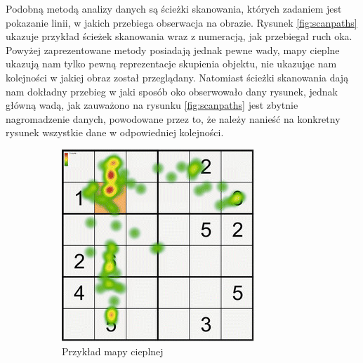 Podobną metodą analizy danych są ścieżki skanowania, których zadaniem jest pokazanie linii, w jakich przebiega obserwacja na obrazie. Rysunek \ref{fig:scanpaths} ukazuje przykład ścieżek skanowania wraz z numeracją, jak przebiegał ruch oka. Powyżej zaprezentowane metody posiadają jednak pewne wady, mapy cieplne ukazują nam tylko pewną reprezentacje skupienia objektu, nie ukazując nam kolejności w jakiej obraz został przeglądany. Natomiast ścieżki skanowania dają nam dokładny przebieg w jaki sposób oko obserwowało dany rysunek, jednak główną wadą, jak zauważono na rysunku \ref{fig:scanpaths} jest zbytnie nagromadzenie danych, powodowane przez to, że należy nanieść na konkretny rysunek wszystkie dane w odpowiedniej kolejności.
\begin{figure}[H]
    \centering
    \captionsetup{justification=centering,margin=2cm}
    \begin{subfigure}{.5\textwidth}
      \centering
      \includegraphics[width=\linewidth]{resources/heatmaps.png}
      \caption{Przykład mapy cieplnej}
      \label{fig:heatmap}
    \end{subfigure}%
    \begin{subfigure}{.5\textwidth}
      \centering

\end{subfigure}
\end{figure}
